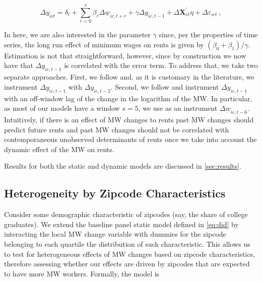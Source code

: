 \begin{equation}\label{eq:ab_panel}
	\Delta y_{ict} = \delta_t
				   + \sum_{r=0}^{s} \beta_r \Delta \underline{w}_{ic,t+r}
				   + \gamma \Delta y_{ic,t-1} + \Delta \mathbf{X}^{'}_{ct}\eta
				   + \Delta \varepsilon_{ict} \ ,
\end{equation}

In here, we are also interested in the parameter $\gamma$ since, per the properties of time
series, the long run effect of minimum wages on rents is given by 
$(\beta_0 + \beta_1)/\gamma$. %
Estimation is not that straightforward, however, since by construction we now have that 
$\Delta y_{ic,t-1}$ is correlated with the error term. To address that, we take two separate 
approaches. First, we follow \textcite{ArellanoBond1991} %
and, as it is customary in the literature, we instrument $\Delta y_{ic,t-1}$ with
$\Delta y_{ic,t-2}$. Second, we follow \textcite{MeerWest2016} and instrument 
$\Delta y_{ic,t-1}$ with an off-window lag of the change in the logarithm of the MW. 
In particular, as most of our models have a window $s=5$, we use as an instrument 
$\Delta \underline{w}_{ic,t-6}$. Intuitively, if there is an effect of MW changes to 
rents past MW changes should predict future rents and past MW changes should not be 
correlated with contemporaneous unobserved determinants of rents once we take into 
account the dynamic effect of the MW on rents.

Results for both the static and dynamic models are discussed in \autoref{sec:results}.


\subsection{Heterogeneity by Zipcode Characteristics}

Consider some demographic characteristic of zipcodes (say, the share of college graduates).
We extend the baseline panel static model defined in \autoref{eq:did} by interacting the 
local MW change variable with dummies for the zipcode belonging to each quartile the 
distribution of such characteristic. This allows us to test for heterogeneous effects of MW 
changes based on zipcode characteristics, therefore assessing whether our effects are driven 
by zipcodes that are expected to have more MW workers. Formally, the model is

